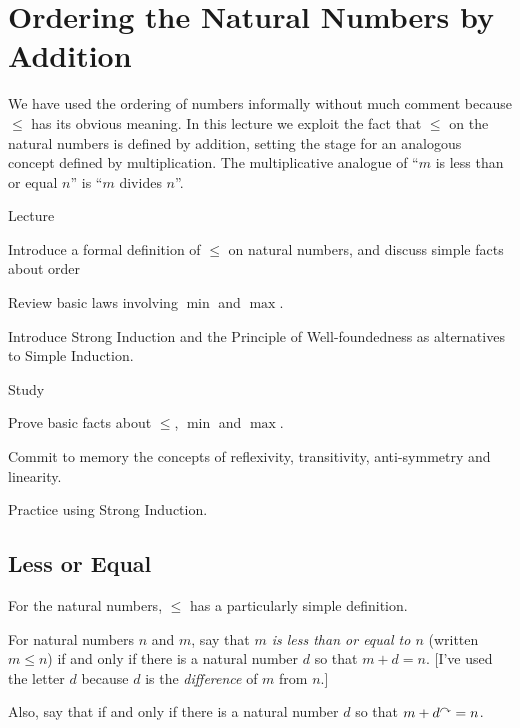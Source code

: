 \chapter{Ordering the Natural Numbers by Addition}

We have used the ordering of numbers informally without much comment
because $\leq$ has its obvious meaning. In this lecture 
we exploit the fact that $\leq$ on the natural numbers is defined by addition, setting the stage for an
analogous concept defined by multiplication. The multiplicative
analogue of ``$m$ is less than or equal $n$'' is ``$m$ divides $n$''.

\begin{goals}
\begin{goal}{Lecture}
\item Introduce a formal definition of $\leq$ on natural numbers, and discuss simple facts about order
\item Review basic laws involving $\min$ and $\max$.
\item Introduce Strong Induction and the Principle of Well-foundedness as alternatives to Simple Induction.
\end{goal}

\begin{goal}{Study}
\item Prove basic facts about $\leq$, $\min$ and $\max$.
\item Commit to memory the concepts of reflexivity, transitivity, anti-symmetry and linearity.
\item Practice using Strong Induction.
\end{goal}
\end{goals}


\section{Less or Equal}

For the natural numbers, $\leq$ has a particularly simple definition.

\begin{defn}
  For natural numbers $n$ and $m$, say that \emph{$m$ is less than or equal to $n$} (written $m\leq n$)
  if and only if there is a
  natural number $d$ so that $m+d = n$.  [I've used the letter $d$
  because $d$ is the \emph{difference} of $m$ from $n$.]
  
  Also, say that  if and only if there is a natural number $d$ so that $m + d^\curvearrowright = n$.
\end{defn}

